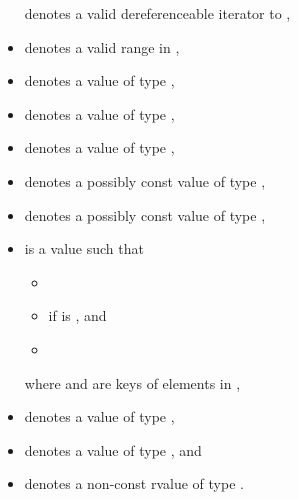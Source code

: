 \documentclass{wg21}
\begin{document}
\begin{itemize}
     denotes a valid dereferenceable iterator to ,
    \item
    \tcode{[q1, q2)} denotes a valid range in ,
    \item
     denotes a value of type ,
    \item
     denotes a value of type ,
    \item
     denotes a value of type ,
    \item
     denotes a possibly const value of type ,
    \item
     denotes a possibly const value of type ,
    \item
     is a value such that
    \begin{itemize}
        \item {}
        \item {} if  is , and
        \item {}
    \end{itemize}
    where  and  are keys of elements in ,
    \item
     denotes a value of type ,
    \item
     denotes a value of type , and
    \item
     denotes a non-const rvalue of type .
\end{itemize}

\newcommand{\indexunordmem}[1]{%
    \indexlibrary{\idxcode{#1}!unordered associative containers}%
    \indexlibrary{\idxcode{unordered_set}!\idxcode{#1}}%
    \indexlibrary{\idxcode{unordered_map}!\idxcode{#1}}%
    \indexlibrary{\idxcode{unordered_multiset}!\idxcode{#1}}%
    \indexlibrary{\idxcode{unordered_multimap}!\idxcode{#1}}%
}
\end{document}
